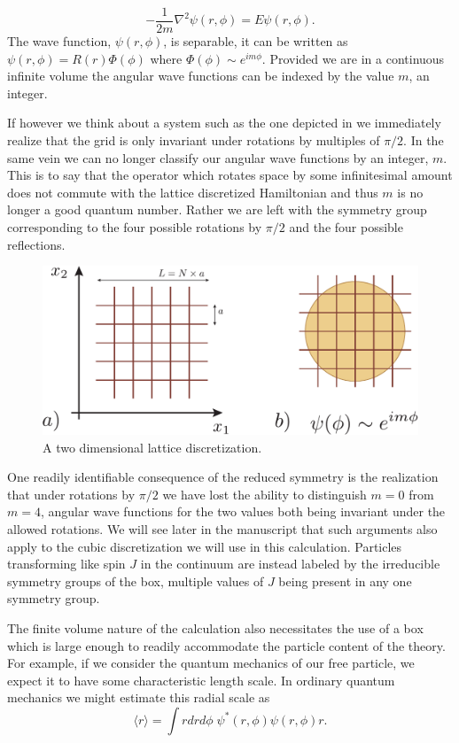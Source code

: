 \begin{equation*}
-\frac{1}{2m}\nabla^2 \psi(r,\phi) = E \psi(r,\phi).
\end{equation*}
The wave function, $\psi(r,\phi)$, is separable, it can be written as $\psi(r,\phi) = R(r)\Phi(\phi)$ where $\Phi(\phi) \sim e^{im\phi}$. Provided we are in a continuous infinite volume the angular wave functions can be indexed by the value $m$, an integer.  

If however we think about a system such as the one depicted in  we immediately realize that the grid is only invariant under rotations by multiples of $\pi/2$. In the same vein we can no longer classify our angular wave functions by an integer, $m$. This is to say that the operator which rotates space by some infinitesimal amount does not commute with the lattice discretized Hamiltonian and thus $m$ is no longer a good quantum number. Rather we are left with the symmetry group corresponding to the four possible rotations by $\pi/2$ and the four possible reflections.

\begin{figure}[htbp]
\centering
\includegraphics[width=0.7\linewidth]{figures/2DLattice/2dLatticeWavefuncs.pdf}
\caption{ A two dimensional lattice discretization. \label{fig::2DlatticeWavefuncs}}
\end{figure}

One readily identifiable consequence of the reduced symmetry is the realization that under rotations by $\pi/2$ we have lost the ability to distinguish $m=0$ from $m=4$, angular wave functions for the two values both being invariant under the allowed rotations. We will see later in the manuscript that such arguments also apply to the cubic discretization we will use in this calculation. Particles transforming like spin $J$ in the continuum are instead labeled by the irreducible symmetry groups of the box, multiple values of $J$ being present in any one symmetry group.  

The finite volume nature of the calculation also necessitates the use of a box which is large enough to readily accommodate the particle content of the theory. For example, if we consider the quantum mechanics of our free particle, we expect it to have some characteristic length scale. In ordinary quantum mechanics we might estimate this radial scale as 
\begin{equation*}
\langle r \rangle  = \int r drd\phi \; \psi^*(r,\phi) \psi(r,\phi) r.
\end{equation*}  

